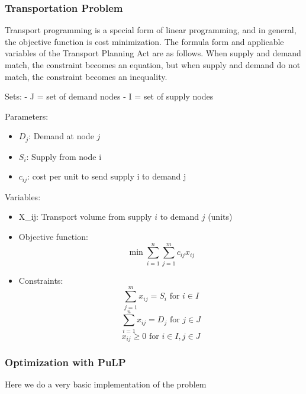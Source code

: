 

\hypertarget{transportation-problem}{%
\subsubsection{Transportation Problem}\label{transportation-problem}}

Transport programming is a special form of linear programming, and in
general, the objective function is cost minimization. The formula form
and applicable variables of the Transport Planning Act are as follows.
When supply and demand match, the constraint becomes an equation, but
when supply and demand do not match, the constraint becomes an
inequality.

Sets: - J = set of demand nodes - I = set of supply nodes

Parameters: 
\begin{itemize}
\item  $D_j$: Demand at node $j$ 
\item  $S_i$: Supply from node i 
\item  $c_{ij}$:
cost per unit to send supply i to demand j
\end{itemize}

Variables: 
\begin{itemize}
\item  X\_ij: Transport volume from supply \(i\) to demand \(j\)
(units)
\end{itemize}

\begin{itemize}
\item
  Objective function: \[\min \sum_{i=1}^n\sum_{j=1}^mc_{ij}x_{ij}\]
\item
  Constraints:
  \[\sum_{j=1}^mx_{ij}=S_i \text{ for } i \in I\]
  \[\sum_{i=1}^nx_{ij}=D_j \text{ for } j \in J\]
 \[ x_{ij}\geq 0 \text{ for } i \in I, j \in J\]
\end{itemize}

    \hypertarget{optimization-with-pulp}{%
\subsubsection{Optimization with PuLP}\label{optimization-with-pulp}}

Here we do a very basic implementation of the problem

